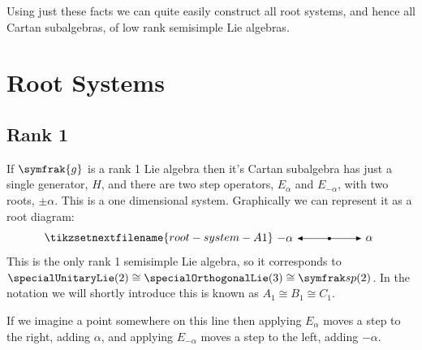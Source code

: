 \documentclass[fleqn]{NotesClass}
\renewcommand{\lie}[1]{\symfrak{#1}}
\newcommand{\isomorphic}{\cong}
\begin{document}
    Using just these facts we can quite easily construct all root systems, and hence all Cartan subalgebras, of low rank semisimple Lie algebras.
    
    \section{Root Systems}
    \subsection{Rank 1}
    If \(\lie{g}\) is a rank 1 Lie algebra then it's Cartan subalgebra has just a single generator, \(H\), and there are two step operators, \(E_\alpha\) and \(E_{-\alpha}\), with two roots, \(\pm \alpha\).
    This is a one dimensional system.
    Graphically we can represent it as a root diagram:
    \begin{equation}
        \tikzsetnextfilename{root-system-A1}
        \begin{tikzpicture}[
            baseline = (alpha.base),
            >={Latex[width=1.5mm]}
            ]
            \draw[->] (0, 0) -- (1, 0) node (alpha) [right] {\(\alpha\)};
            \draw[->] (0, 0) -- (-1, 0) node [left] {\(-\alpha\)};
            \fill (0, 0) circle [radius = 0.05];
        \end{tikzpicture}
    \end{equation}
    This is the only rank 1 semisimple Lie algebra, so it corresponds to \(\specialUnitaryLie(2) \isomorphic \specialOrthogonalLie(3) \isomorphic \symplecticLie(2)\).
    In the notation we will shortly introduce this is known as \(A_1 \isomorphic B_1 \isomorphic C_1\).
    
    If we imagine a point somewhere on this line then applying \(E_\alpha\) moves a step to the right, adding \(\alpha\), and applying \(E_{-\alpha}\) moves a step to the left, adding \(-\alpha\).
    
\end{document}
